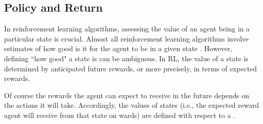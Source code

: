 \subsection{Policy and Return}
In reinforcement learning algorithms, assessing the value of an agent being in a particular state is crucial. 
Almost all reinforcement learning algorithms involve estimates of how good is it for the agent to be in a given state \cite{RL}.
However, defining ``how good" a state is can be ambiguous. In RL, the value of a state is determined by anticipated future rewards, or more precisely, in terms of expected rewards.

Of course the rewards the agent can expect to receive in the future depends on the actions it will take. Accordingly, the values of states (i.e., the expected reward agent will receive from that state on wards) are defined with respect to a .

